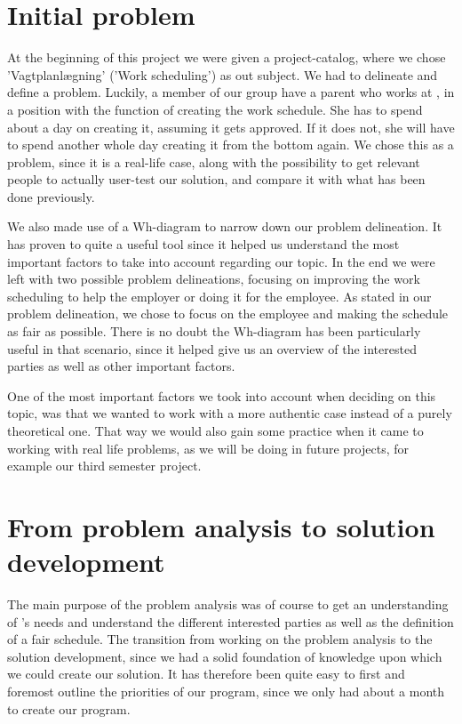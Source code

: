 \section{Initial problem} %
At the beginning of this project we were given a project-catalog, where we chose 'Vagtplanlægning' ('Work scheduling') as out subject. We had to delineate and define a problem. Luckily, a member of our group have a parent who works at \siemens, in a position with the function of creating the work schedule. She has to spend about a day on creating it, assuming it gets approved. If it does not, she will have to spend another whole day creating it from the bottom again. We chose this as a problem, since it is a real-life case, along with the possibility to get relevant people to actually user-test our solution, and compare it with what has been done previously.

We also made use of a Wh-diagram to narrow down our problem delineation. It has proven to quite a useful tool since it helped us understand the most important factors to take into account regarding our topic. In the end we were left with two possible problem delineations, focusing on improving the work scheduling to help the employer or doing it for the employee. As stated in our problem delineation, we chose to focus on the employee and making the schedule as fair as possible. There is no doubt the Wh-diagram has been particularly useful in that scenario, since it helped give us an overview of the interested parties as well as other important factors.

One of the most important factors we took into account when deciding on this topic, was that we wanted to work with a more authentic case instead of a purely theoretical one. That way we would also gain some practice when it came to working with real life problems, as we will be doing in future projects, for example our third semester project.

\section{From problem analysis to solution development}
The main purpose of the problem analysis was of course to get an understanding of \siemens's needs and understand the different interested parties as well as the definition of a fair schedule. The transition from working on the problem analysis to the solution development, since we had a solid foundation of knowledge upon which we could create our solution. It has therefore been quite easy to first and foremost outline the priorities of our program, since we only had about a month to create our program. 

